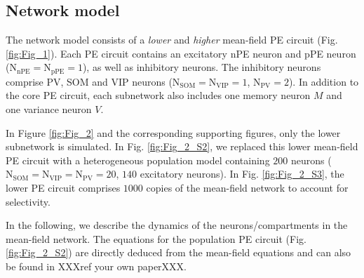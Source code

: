 \documentclass[10pt,a4paper,draft]{article}
\begin{document}
\subsection{Network model}
%
The network model consists of a \textit{lower} and \textit{higher} mean-field PE circuit (Fig. \ref{fig:Fig_1}). Each PE circuit contains an excitatory nPE neuron and pPE neuron ($\mathrm{N}_\mathrm{nPE} = \mathrm{N}_\mathrm{pPE} = 1$), as well as inhibitory neurons. The inhibitory neurons comprise PV, SOM and VIP neurons ($\mathrm{N}_\mathrm{SOM} = \mathrm{N}_\mathrm{VIP} = 1$, $\mathrm{N}_\mathrm{PV} = 2$). In addition to the core PE circuit, each subnetwork also includes one memory neuron $M$ and one variance neuron $V$. 

In Figure \ref{fig:Fig_2} and the corresponding supporting figures, only the lower subnetwork is simulated. In Fig. \ref{fig:Fig_2_S2}, we replaced this lower mean-field PE circuit with a heterogeneous population model containing $200$ neurons ($\mathrm{N}_\mathrm{SOM} = \mathrm{N}_\mathrm{VIP} = \mathrm{N}_\mathrm{PV} = 20$, $140$ excitatory neurons). In Fig. \ref{fig:Fig_2_S3}, the lower PE circuit comprises $1000$ copies of the mean-field network to account for selectivity.

In the following, we describe the dynamics of the neurons/compartments in the mean-field network. The equations for the population PE circuit (Fig. \ref{fig:Fig_2_S2}) are directly deduced from the mean-field equations and can also be found in XXXref your own paperXXX.
\end{document}
